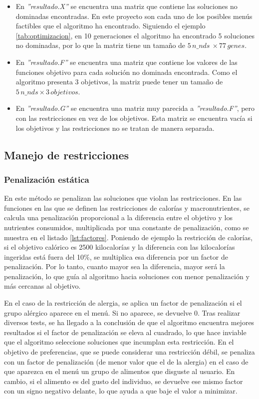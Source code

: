 \begin{itemize}
    \item En \textit{''resultado.X''} se encuentra una matriz que contiene las soluciones no dominadas encontradas. En este proyecto son cada uno de los posibles menús factibles que el algoritmo ha encontrado. Siguiendo el ejemplo \ref{tab:optimizacion}, en 10 generaciones el algoritmo ha encontrado 5 soluciones no dominadas, por lo que la matriz tiene un tamaño de \(5 \, n\_nds\ \times 77 \, genes\).
    \item En \textit{''resultado.F''} se encuentra una matriz que contiene los valores de las funciones objetivo para cada solución no dominada encontrada. Como el algoritmo presenta 3 objetivos, la matriz puede tener un tamaño de \(5 \, n\_nds \times 3 \, objetivos\).
    \item En \textit{''resultado.G''} se encuentra una matriz muy parecida a \textit{''resultado.F''}, pero con las restricciones en vez de los objetivos. Esta matriz se encuentra vacía si los objetivos y las restricciones no se tratan de manera separada.
\end{itemize}

\subsection{Manejo de restricciones}
\label{ch:manejo-restricciones}

\subsubsection{Penalización estática}
\label{ch:penalizacion-estatica}

En este método se penalizan las soluciones que violan las restricciones. En las funciones en las que se definen las restricciones de calorías y macronutrientes, se calcula una penalización proporcional a la diferencia entre el objetivo y los nutrientes consumidos, multiplicada por una constante de penalización, como se muestra en el listado \ref{lst:factores}. Poniendo de ejemplo la restricción de calorías, si el objetivo calórico es 2500 kilocalorías y la diferencia con las kilocalorías ingeridas está fuera del 10\%, se multiplica esa diferencia por un factor de penalización. Por lo tanto, cuanto mayor sea la diferencia, mayor será la penalización, lo que guía al algoritmo hacia soluciones con menor penalización y más cercanas al objetivo.

En el caso de la restricción de alergia, se aplica un factor de penalización si el grupo alérgico aparece en el menú. Si no aparece, se devuelve 0. Tras realizar diversos tests, se ha llegado a la conclusión de que el algoritmo encuentra mejores resultados si el factor de penalización se eleva al cuadrado, lo que hace inviable que el algoritmo seleccione soluciones que incumplan esta restricción.
\newpage
En el objetivo de preferencias, que se puede considerar una restricción débil, se penaliza con un factor de penalización (de menor valor que el de la alergia) en el caso de que aparezca en el menú un grupo de alimentos que disguste al usuario. En cambio, si el alimento es del gusto del individuo, se devuelve ese mismo factor con un signo negativo delante, lo que ayuda a que baje el valor a minimizar.

